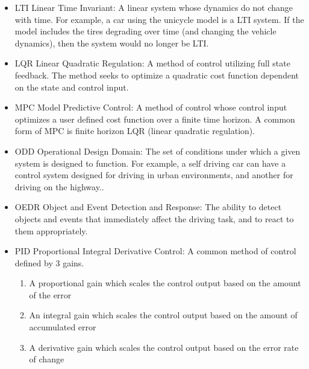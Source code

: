 \begin{itemize}
\item LTI Linear Time Invariant: A linear system whose dynamics do not change with time. 
For example, a car using the unicycle model is a LTI system. 
If the model includes the tires degrading over time (and changing the vehicle dynamics), then the system would no longer be LTI.
\end{itemize}

\begin{itemize}
\item LQR Linear Quadratic Regulation: A method of control utilizing full state feedback. The method seeks to optimize a quadratic cost function dependent on the state and control input.
\end{itemize}

\begin{itemize}
\item MPC Model Predictive Control: A method of control whose control input optimizes a user defined cost function over a finite time horizon. 
A common form of MPC is finite horizon LQR (linear quadratic regulation).
\end{itemize}

\begin{itemize}
\item ODD Operational Design Domain: The set of conditions under which a given system is designed to function. 
For example, a self driving car can have a control system designed for driving in urban environments, and another for driving on the highway..
\end{itemize}

\begin{itemize}
\item OEDR Object and Event Detection and Response: The ability to detect objects and events that 
immediately affect the driving task, and to react to them appropriately.
\end{itemize}


\begin{itemize}
\item PID Proportional Integral Derivative Control: A common method of control defined by 3 gains.
\begin{enumerate}
\item A proportional gain which scales the control output based on the amount of the error
\item An integral gain which scales the control output based on the amount of accumulated error
\item A derivative gain which scales the control output based on the error rate of change
\end{enumerate}
\end{itemize}


